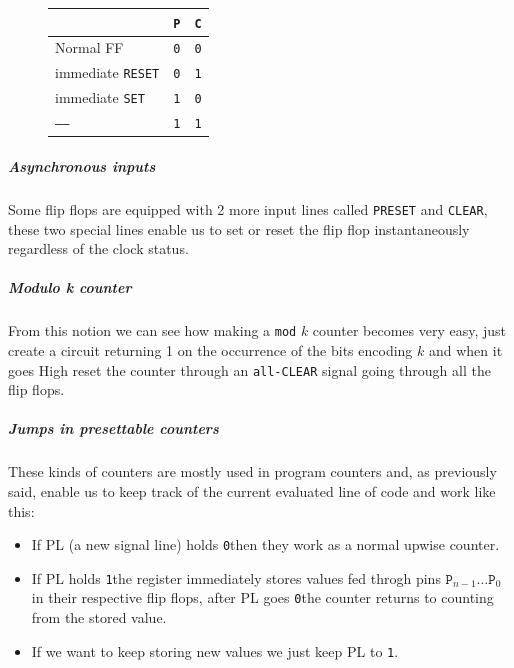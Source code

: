\documentclass{scrartcl}
\newcommand{\zero}{\texttt{0}}
\newcommand{\one}{\texttt{1}}
\begin{document}
    \begin{figure}
        \centering
        \begin{tabular}{| l | c | c |}
            \hline
            & \texttt{P} & \texttt{C} \\\hline
            Normal FF & \zero & \zero\\
            immediate \texttt{RESET} & \zero & \one\\
            immediate \texttt{SET} & \one & \zero\\
            \texttt{-----} & \one & \one\\\hline
        \end{tabular}
    \end{figure}
    \vspace{-1cm}
    \subparagraph{Asynchronous inputs} Some flip flops are equipped with 2 more input lines called \texttt{PRESET} and \texttt{CLEAR}, these two special lines enable us to set or reset the flip flop instantaneously regardless of the clock status.
    \subparagraph{Modulo k counter} From this notion we can see how making a \texttt{mod} $k$ counter becomes very easy, just create a circuit returning 1 on the occurrence of the bits encoding $k$ and when it goes High reset the counter through an \texttt{all-CLEAR} signal going through all the flip flops.
    \subparagraph{Jumps in presettable counters} These kinds of counters are mostly used in program counters and, as previously said, enable us to keep track of the current evaluated line of code and work like this:
    \begin{itemize}
        \item If PL (a new signal line) holds \zero then they work as a normal upwise counter.
        \item If PL holds \one the register immediately stores values fed throgh pins $\texttt{P}_{n-1}\dots\texttt{P}_0$ in their respective flip flops, after PL goes \zero the counter returns to counting from the stored value.
        \item If we want to keep storing new values we just keep PL to \one.
    \end{itemize}
\end{document}

